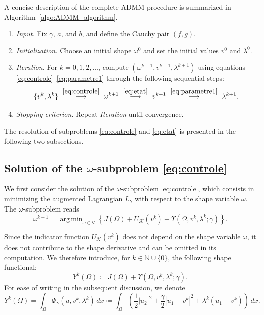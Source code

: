 \documentclass[a4paper,11pt]{article}
\DeclareMathOperator*{\argmin}{arg\,min}
\newcommand{\ur}{u_{1}}
\newcommand{\ui}{u_{2}}
\newcommand{\intO}[1]{\int_{\varOmega}{#1}{\, {d}{x}}}
\newcommand{\ADMMpara}{\gamma}
\begin{document}
A concise description of the complete ADMM procedure is summarized in
Algorithm~\ref{algo:ADMM_algorithm}. 

\begin{algorithm}
\begin{enumerate}\itemsep0.1em 
	\item \textit{Input.} Fix $\ADMMpara$, $a$, and $b$, and define the Cauchy pair $(f, g)$.
	\item \textit{Initialization.} Choose an initial shape $\omega^{0}$ and set the initial values
	$v^{0}$ and $\lambda^{0}$.
	\item \textit{Iteration.} For $k = 0,1,2,\ldots$, compute $(\omega^{k+1}, v^{k+1}, \lambda^{k+1})$
	using equations \eqref{eq:controle}--\eqref{eq:parametre1} through the following sequential steps:
	\[
		\{v^{k}, \lambda^{k}\}
		\ \stackrel{\eqref{eq:controle}}{\longrightarrow} \ 
		\omega^{k+1}
		\ \stackrel{\eqref{eq:etat}}{\longrightarrow} \ 
		v^{k+1}
		\ \stackrel{\eqref{eq:parametre1}}{\longrightarrow} \ 
		\lambda^{k+1}.
	\]
	\item \textit{Stopping criterion.} Repeat \textit{Iteration} until convergence.
\end{enumerate}
\caption{ADMM algorithm for the solution of problem \eqref{eq:control}.}
\label{algo:ADMM_algorithm}
\end{algorithm}

The resolution of subproblems \eqref{eq:controle} and \eqref{eq:etat} is presented in the following two subsections.

\subsection{Solution of the $\omega$-subproblem \eqref{eq:controle}}
\label{subsec:omega_subproblem}

We first consider the solution of the $\omega$-subproblem \eqref{eq:controle}, which consists in
minimizing the augmented Lagrangian ${L}_{\ADMMpara}$ with respect to the shape variable $\omega$.
The $\omega$-subproblem reads
\[
 \omega^{k+1}
 =
 \argmin_{\omega \in \mathcal{U}}
 \left\{
 J({\varOmega})
 + U_{\mathcal{K}}(v^{k})
 + \Upsilon(\varOmega, v^{k}, \lambda^{k}; \ADMMpara)
 \right\}.
\]

Since the indicator function $U_{\mathcal{K}}(v^{k})$ does not depend on the shape variable $\omega$, it does not contribute to the shape derivative and can be omitted in its computation.
We therefore introduce, for $k\in \mathbb{N} \cup \{0\}$, the following shape functional:
\[
Y^{k}({\varOmega})
\coloneqq
J({\varOmega})
+
\Upsilon(\varOmega, v^{k}, \lambda^{k}; \ADMMpara).
\]
For ease of writing in the subsequent discussion, we denote
\[
	Y^{k}({\varOmega})
	= \intO{ \Phi_{\ADMMpara}(u, v^{k}, \lambda^{k}) } %
	\coloneqq \intO{
	\left( 
	\frac12 |\ui |^2
        +
        \frac{\ADMMpara}{2}|\ur -v^{k}|^2
        +
        \lambda^{k}(\ur -v^{k})
	\right)
	}.
\]
\end{document}
